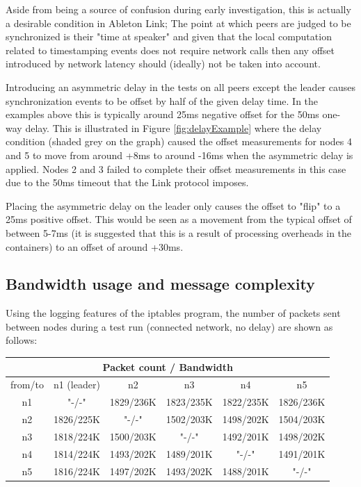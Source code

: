 \documentclass[11pt]{article} %
\theoremstyle{plain}
\theoremstyle{definition}
\begin{document}
Aside from being a source of confusion during early investigation, this is
actually a desirable condition in Ableton Link; The point at which peers are
judged to be synchronized is their "time at speaker" and given that the local
computation related to timestamping events does not require network calls then
any offset introduced by network latency should (ideally) not be taken into
account.

Introducing an asymmetric delay in the tests on all peers except the leader
causes synchronization events to be offset by half of the given delay time. In
the examples above this is typically around 25ms negative offset for the 50ms
one-way delay. This is illustrated in Figure \ref{fig:delayExample} where the delay
condition (shaded grey on the graph) caused the offset measurements for nodes 4
and 5 to move from around +8ms to around -16ms when the asymmetric delay is
applied. Nodes 2 and 3 failed to complete their offset measurements in this
case due to the 50ms timeout that the Link protocol imposes.

Placing the asymmetric delay on the leader only causes the
offset to "flip" to a 25ms positive offset. This would be seen as
a movement from the typical offset of between 5-7ms (it is suggested that
this is a result of processing overheads in the containers) to an offset of
around +30ms.

\subsection{Bandwidth usage and message complexity}

Using the logging features of the iptables program, the number of packets sent
between nodes during a test run (connected network, no delay) are shown as
follows:

\begin{center}
\begin{tabular}{|c|c|c|c|c|c|}
 \hline
  \multicolumn{6}{|c|}{Packet count / Bandwidth} \\
 \hline
  from/to &  n1 (leader) & n2 & n3 & n4 & n5\\
 \hline
  n1 & "-/-" & 1829/236K & 1823/235K & 1822/235K & 1826/236K\\
  n2 &1826/225K & "-/-" & 1502/203K & 1498/202K & 1504/203K\\
  n3 &1818/224K & 1500/203K & "-/-" & 1492/201K & 1498/202K\\
  n4 &1814/224K & 1493/202K & 1489/201K & "-/-" & 1491/201K\\
  n5 &1816/224K & 1497/202K & 1493/202K & 1488/201K & "-/-"\\
 \hline
\end{tabular}
\end{center}
\end{document}
